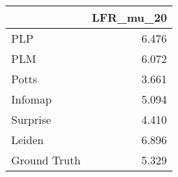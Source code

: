 \begin{tabular}{lr}
\toprule
{} & LFR_mu_20 \\
\midrule
PLP          &     6.476 \\
PLM          &     6.072 \\
Potts        &     3.661 \\
Infomap      &     5.094 \\
Surprise     &     4.410 \\
Leiden       &     6.896 \\
Ground Truth &     5.329 \\
\bottomrule
\end{tabular}
